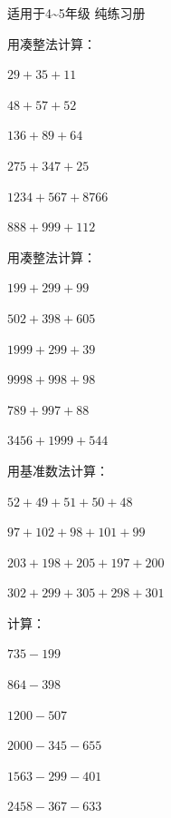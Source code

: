 \documentclass[a4paper,12pt]{ctexart}
\begin{document}
\pagestyle{empty}

\begin{center}
  \large 适用于4\~{}5年级 \quad 纯练习册
\end{center}
\vspace{0.5cm}



\bigskip

\begin{exercise}
\item 用凑整法计算：
  \begin{subexercise}
    \item $29+35+11$
    \item $48+57+52$
    \item $136+89+64$
    \item $275+347+25$
    \item $1234+567+8766$
    \item $888+999+112$
  \end{subexercise}

\item 用凑整法计算：
  \begin{subexercise}
    \item $199+299+99$
    \item $502+398+605$
    \item $1999+299+39$
    \item $9998+998+98$
    \item $789+997+88$
    \item $3456+1999+544$
  \end{subexercise}

\item 用基准数法计算：
  \begin{subexercise}
    \item $52+49+51+50+48$
    \item $97+102+98+101+99$
    \item $203+198+205+197+200$
    \item $302+299+305+298+301$
  \end{subexercise}

\item 计算：
  \begin{subexercise}
    \item $735-199$
    \item $864-398$
    \item $1200-507$
    \item $2000-345-655$
    \item $1563-299-401$
    \item $2458-367-633$
  \end{subexercise}


\end{exercise}
\end{document}
